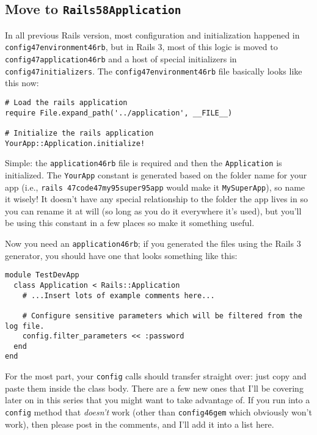 \documentclass{book}
\begin{document}
\hypertarget{move_to_}{}\subsection*{{Move to {\colorbox[rgb]{0.87,0.87,0.87}{\tt Rails\char58Application}}}}\label{move_to_}

In all previous Rails version, most configuration and initialization happened in {\colorbox[rgb]{0.87,0.87,0.87}{\tt config\char47environment\char46rb}}, but in Rails 3, most of this logic is moved to {\colorbox[rgb]{0.87,0.87,0.87}{\tt config\char47application\char46rb}} and a host of special initializers in {\colorbox[rgb]{0.87,0.87,0.87}{\tt config\char47initializers}}. The {\colorbox[rgb]{0.87,0.87,0.87}{\tt config\char47environment\char46rb}} file basically looks like this now:

\begin{verbatim}# Load the rails application
require File.expand_path('../application', __FILE__)

# Initialize the rails application
YourApp::Application.initialize!\end{verbatim}
Simple: the {\colorbox[rgb]{0.87,0.87,0.87}{\tt application\char46rb}} file is required and then the {\colorbox[rgb]{0.87,0.87,0.87}{\tt Application}} is initialized. The {\colorbox[rgb]{0.87,0.87,0.87}{\tt YourApp}} constant is generated based on the folder name for your app (i.e., {\colorbox[rgb]{0.87,0.87,0.87}{\tt rails~\char47code\char47my\char95super\char95app}} would make it {\colorbox[rgb]{0.87,0.87,0.87}{\tt MySuperApp}}), so name it wisely! It doesn'{}t have any special relationship to the folder the app lives in so you can rename it at will (so long as you do it everywhere it'{}s used), but you'{}ll be using this constant in a few places so make it something useful.

Now you need an {\colorbox[rgb]{0.87,0.87,0.87}{\tt application\char46rb}}; if you generated the files using the Rails 3 generator, you should have one that looks something like this:

\begin{verbatim}module TestDevApp
  class Application < Rails::Application
    # ...Insert lots of example comments here...
    
    # Configure sensitive parameters which will be filtered from the log file.
    config.filter_parameters << :password
  end
end\end{verbatim}
For the most part, your {\colorbox[rgb]{0.87,0.87,0.87}{\tt config}} calls should transfer straight over: just copy and paste them inside the class body. There are a few new ones that I'{}ll be covering later on in this series that you might want to take advantage of. If you run into a {\colorbox[rgb]{0.87,0.87,0.87}{\tt config}} method that \emph{doesn'{}t} work (other than {\colorbox[rgb]{0.87,0.87,0.87}{\tt config\char46gem}} which obviously won'{}t work), then please post in the comments, and I'{}ll add it into a list here.
\end{document}
